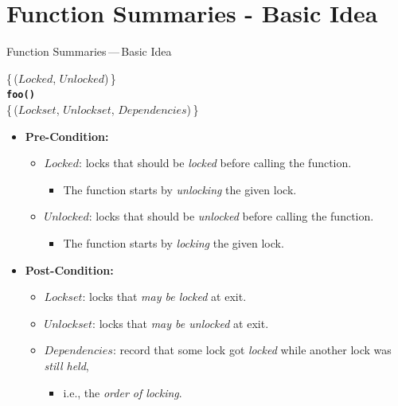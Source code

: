 \documentclass[10pt, xcolor=pdflatex, hyperref={unicode}, aspectratio=169]{beamer}
\begin{document}


\section{Function Summaries - Basic Idea}
\begin{frame}{Function Summaries\,---\,Basic Idea}
    \begin{center}
        \large
        \{\,($ Locked $, $ Unlocked $)\,\} \\
        \textbf{\texttt{foo()}} \\
        \{\,($ Lockset $, $ Unlockset $, $ Dependencies $)\,\}
    \end{center}

    \begin{itemize}\setlength\itemsep{1.5em}
        \item \textbf{Pre-Condition:}
            \vspace{.3em}
            \begin{itemize}\setlength\itemsep{.5em}
                \item \alert{$ Locked $}: locks that should be \emph{locked} before calling the function.
                    \begin{itemize}
                        \item The function starts by \emph{unlocking} the given lock.
                    \end{itemize}

                \item \alert{$ Unlocked $}: locks that should be \emph{unlocked} before calling the function.
                    \begin{itemize}
                        \item The function starts by \emph{locking} the given lock.
                    \end{itemize}
            \end{itemize}

        \item \textbf{Post-Condition:}
            \vspace{.3em}
            \begin{itemize}\setlength\itemsep{.5em}
                \item \alert{$ Lockset $}: locks that \emph{may be locked} at exit.

                \item \alert{$ Unlockset $}: locks that \emph{may be unlocked} at exit.

                \item \alert{$ Dependencies $}: record that some lock got \emph{locked} while another lock was \emph{still held},
                    \begin{itemize}
                        \item i.e., the \emph{order of locking}.
                    \end{itemize}
            \end{itemize}
    \end{itemize}
\end{frame}
\end{document}

